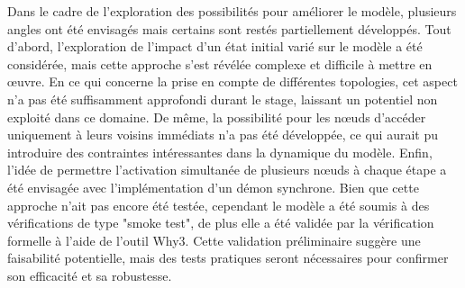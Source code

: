 \documentclass[11pt]{article}
\begin{document}
Dans le cadre de l'exploration des possibilités pour améliorer le modèle, 
plusieurs angles ont été envisagés mais certains sont restés partiellement développés. 
Tout d'abord, l'exploration de l'impact d'un état initial varié sur le modèle a été considérée, 
mais cette approche s'est révélée complexe et difficile à mettre en œuvre. 
En ce qui concerne la prise en compte de différentes topologies, 
cet aspect n'a pas été suffisamment approfondi durant le stage, laissant un potentiel non exploité dans ce domaine. 
De même, la possibilité pour les nœuds d'accéder uniquement à leurs voisins immédiats n'a pas été développée, 
ce qui aurait pu introduire des contraintes intéressantes dans la dynamique du modèle. 
Enfin, l'idée de permettre l'activation simultanée de plusieurs nœuds à chaque étape a été envisagée avec l'implémentation d'un démon synchrone. 
Bien que cette approche n'ait pas encore été testée, cependant le modèle a été soumis à des vérifications de type "smoke test", 
de plus elle a été validée par la vérification formelle à l'aide de l'outil Why3. 
Cette validation préliminaire suggère une faisabilité potentielle, mais des tests pratiques seront nécessaires pour confirmer son efficacité et sa robustesse.
\end{document}
